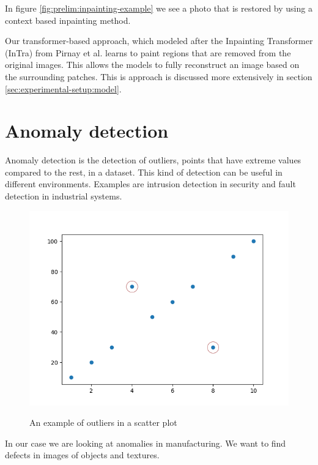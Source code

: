 In figure \ref{fig:prelim:inpainting-example} we see a photo that is restored by using a context based inpainting method.

Our transformer-based approach, which modeled after the Inpainting Transformer (InTra) from Pirnay et al. \cite{pirnay_inpainting_2021} learns to paint regions that are removed from the original images. This allows the models to fully reconstruct an image based on the surrounding patches. This is approach is discussed more extensively in section \ref{sec:experimental-setup:model}.

\section{Anomaly detection}
\label{sec:prelim:anomaly-detection}

Anomaly detection is the detection of outliers, points that have extreme values compared to the rest, in a dataset.
This kind of detection can be useful in different environments. Examples are intrusion detection in security and fault detection in industrial systems.

\begin{figure}[ht!]
\caption{An example of outliers in a scatter plot}
\centering
\includegraphics[width=\textwidth]{imgs/outliers-example.png}
\label{fig:prelim:outliers-example}
\end{figure}

In our case we are looking at anomalies in manufacturing. We want to find defects in images of objects and textures.


 
